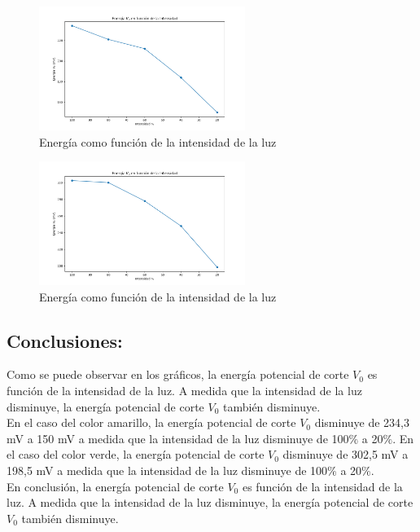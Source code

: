 \documentclass[a4paper]{article}
\begin{document}
        \begin{figure}[h]
          \centering
          \includegraphics[width=6.7cm]{../imagenes/amarillo_energia_intensidad.png}
          \caption{\small Energía como función de la intensidad de la luz}
        \end{figure}

        \begin{figure}[h]
          \centering
          \includegraphics[width=6.7cm]{../imagenes/verde_energia_intensidad.png}
          \caption{\small Energía como función de la intensidad de la luz}
        \end{figure}
        
        \newpage
        \noindent
        \thispagestyle{fancy}
        
        
        \subsection{Conclusiones:}
        \indent Como se puede observar en los gráficos, la energía potencial de corte $V_{0}$ es función de la intensidad de la luz. A medida que la intensidad de la luz disminuye, la energía potencial de corte $V_{0}$ también disminuye.\\
        \indent En el caso del color amarillo, la energía potencial de corte $V_{0}$ disminuye de 234,3 mV a 150 mV a medida que la intensidad de la luz disminuye de 100$\%$ a 20$\%$. En el caso del color verde, la energía potencial de corte $V_{0}$ disminuye de 302,5 mV a 198,5 mV a medida que la intensidad de la luz disminuye de 100$\%$ a 20$\%$.\\
        \indent En conclusión, la energía potencial de corte $V_{0}$ es función de la intensidad de la luz. A medida que la intensidad de la luz disminuye, la energía potencial de corte $V_{0}$ también disminuye.
\end{document}
